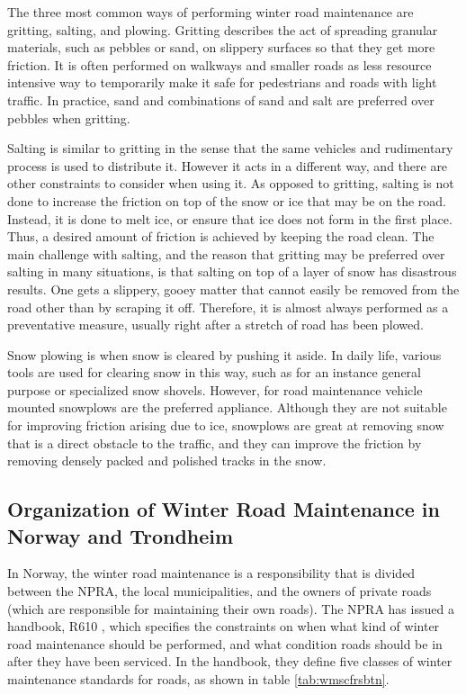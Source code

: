 The three most common ways of performing winter road maintenance are gritting, salting, and plowing. Gritting describes the act of spreading granular materials, such as pebbles or sand, on slippery surfaces so that they get more friction. It is often performed on walkways and smaller roads as less resource intensive way to temporarily make it safe for pedestrians and roads with light traffic. In practice, sand and combinations of sand and salt are preferred over pebbles when gritting.

Salting is similar to gritting in the sense that the same vehicles and rudimentary process is used to distribute it. However it acts in a different way, and there are other constraints to consider when using it. As opposed to gritting, salting is not done to increase the friction on top of the snow or ice that may be on the road. Instead, it is done to melt ice, or ensure that ice does not form in the first place. Thus, a desired amount of friction is achieved by keeping the road clean. The main challenge with salting, and the reason that gritting may be preferred over salting in many situations, is that salting on top of a layer of snow has disastrous results. One gets a slippery, gooey matter that cannot easily be removed from the road other than by scraping it off. Therefore, it is almost always performed as a preventative measure, usually right after a stretch of road has been plowed.

Snow plowing is when snow is cleared by pushing it aside. In daily life, various tools are used for clearing snow in this way, such as for an instance general purpose or specialized snow shovels. However, for road maintenance vehicle mounted snowplows are the preferred appliance. Although they are not suitable for improving friction arising due to ice, snowplows are great at removing snow that is a direct obstacle to the traffic, and they can improve the friction  by removing densely packed and polished tracks in the snow.

\subsection{Organization of Winter Road Maintenance in Norway and Trondheim} %
\label{ssub:how_winter_road_maintenance_is_organized_in_norway_and_trondheim}


In Norway, the winter road maintenance is a responsibility that is divided between the NPRA, the local municipalities, and the owners of private roads (which are responsible for maintaining their own roads). The NPRA has issued a handbook, R610 \citep{svvR610}, which specifies the constraints on when what kind of winter road maintenance should be performed, and what condition roads should be in after they have been serviced. In the handbook, they define five classes of winter maintenance standards for roads, as shown in table \ref{tab:wmscfrsbtn}.

